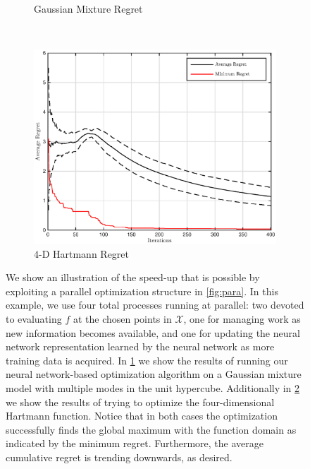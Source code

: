 \documentclass[]{article}
\newcommand{\1}{\mathbf{1}}
\newcommand{\0}{\mathbf{0}}
\newcommand{\X}{\mathcal{X}}
\begin{document}
\begin{figure}
\begin{subfigure}[b]{0.3\textwidth}
	\caption{Gaussian Mixture Regret}
	\label{fig:cumu_regr_1}
\end{subfigure}
~
\begin{subfigure}[b]{0.3\textwidth}
	\includegraphics[width=\textwidth]{images/hm.eps}
	\caption{$4$-D Hartmann Regret}
	\label{fig:cumu_regr_2}
\end{subfigure}
\caption{We show an illustration of the speed-up that is possible by exploiting a parallel optimization structure in \ref{fig:para}. In this example, we use four total processes running at parallel: two devoted to evaluating $f$ at the chosen points in $\X$, one for managing work as new information becomes available, and one for updating the neural network representation learned by the neural network as more training data is acquired. In \ref{fig:cumu_regr_1} we show the results of running our neural network-based optimization algorithm on a Gaussian mixture model with multiple modes in the unit hypercube. Additionally in \ref{fig:cumu_regr_2} we show the results of trying to optimize the four-dimensional Hartmann function. Notice that in both cases the optimization successfully finds the global maximum with the function domain as indicated by the minimum regret. Furthermore, the average cumulative regret is trending downwards, as desired.}
\label{fig:para-cumu-regr}
\end{figure}
\end{document}
